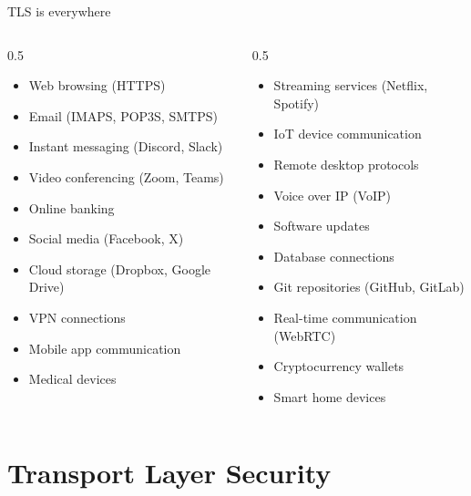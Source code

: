\ifdefined\PRESENTATION\else\PassOptionsToClass{handout}{beamer}\fi\documentclass[aspectratio=169, lualatex]{beamer}
\begin{document}
\begin{frame}{TLS is everywhere}
	\begin{columns}[c]
		\begin{column}{0.5\textwidth}
			\begin{itemize}[<+->]
				\item Web browsing (HTTPS)
				\item Email (IMAPS, POP3S, SMTPS)
				\item Instant messaging (Discord, Slack)
				\item Video conferencing (Zoom, Teams)
				\item Online banking
				\item Social media (Facebook, X)
				\item Cloud storage (Dropbox, Google Drive)
				\item VPN connections
				\item Mobile app communication
				\item Medical devices
			\end{itemize}
		\end{column}
		\begin{column}{0.5\textwidth}
			\begin{itemize}[<+->]
				\item Streaming services (Netflix, Spotify)
				\item IoT device communication
				\item Remote desktop protocols
				\item Voice over IP (VoIP)
				\item Software updates
				\item Database connections
				\item Git repositories (GitHub, GitLab)
				\item Real-time communication (WebRTC)
				\item Cryptocurrency wallets
				\item Smart home devices
			\end{itemize}
		\end{column}
	\end{columns}
\end{frame}

\section{Transport Layer Security}
\end{document}
